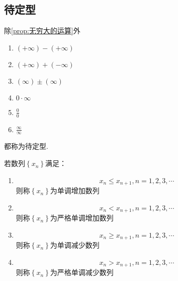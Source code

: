 \subsection{待定型}
\begin{formal}
    \begin{definition}[待定型的定义]\label{def:待定型的定义}
        除\cref{prop:无穷大的运算}外\begin{enumerate}[label={\textup{(\arabic*)}}]
            \item $\left(+\infty\right)-\left(+\infty\right)$
            \item $\left(+\infty\right)+\left(-\infty\right)$
            \item $\left(\infty\right)\pm\left(\infty\right)$
            \item $0\cdot\infty$
            \item $\displaystyle \frac{0}{0}$
            \item $\displaystyle \frac{\infty}{\infty}$
        \end{enumerate}都称为待定型.
    \end{definition}
\end{formal}
\begin{formal}
    \begin{definition}[数列单调性的定义]\label{def:数列单调性的定义}
        若数列$\left\{x_n\right\}$满足：\begin{enumerate}[label={\textup{(\arabic*)}}]
            \item \[
            x_n\leqslant x_{n+1},n=1,2,3,\cdots
            \]则称$\left\{x_n\right\}$为单调增加数列
            \item \[
            x_n<x_{n+1},n=1,2,3,\cdots
            \]则称$\left\{x_n\right\}$为严格单调增加数列
            \item \[
            x_n\geqslant x_{n+1},n=1,2,3,\cdots
            \]则称$\left\{x_n\right\}$为单调减少数列
            \item \[
            x_n>x_{n+1},n=1,2,3,\cdots
            \]则称$\left\{x_n\right\}$为严格单调减少数列
        \end{enumerate}
    \end{definition}
\end{formal}
